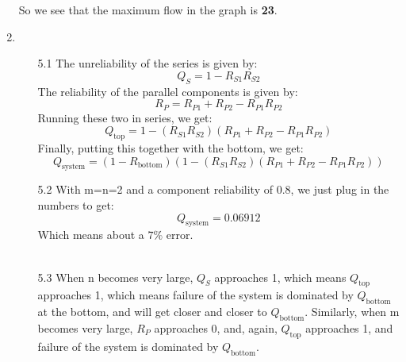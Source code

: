 \begin{enumerate}
\begin{figure}[H]
    \end{figure}
    So we see that the maximum flow in the graph is \textbf{23}.
  \item 
    \begin{itemize}
      \item [5.1]
        The unreliability of the series is given by:
        $$Q_S = 1 - R_{S1}R_{S2}$$
        The reliability of the parallel components is given by:
        $$R_P = R_{P1} + R_{P2} - R_{P1}R_{P2}$$
        Running these two in series, we get:
        $$Q_{\text{top}} = 1 - (R_{S1}R_{S2})(R_{P1} + R_{P2} - R_{P1}R_{P2})$$
        Finally, putting this together with the bottom, we get:
        $$Q_{\text{system}} = (1 - R_{\text{bottom}})(1 - (R_{S1}R_{S2})(R_{P1} + R_{P2} - R_{P1}R_{P2}))$$

      \item [5.2]
        With m=n=2 and a component reliability of $0.8$, we just plug in the numbers to get:
        $$Q_{\text{system}} = 0.06912$$
        Which means about a $7\%$ error.\\\\

      \item [5.3]
        When n becomes very large, $Q_S$ approaches 1, which means $Q_{\text{top}}$ approaches 1, which means failure of the system is dominated by $Q_{\text{bottom}}$ at the bottom, and will get closer and closer to $Q_{\text{bottom}}$. Similarly, when m becomes very large, $R_P$ approaches 0, and, again, $Q_{\text{top}}$ approaches 1, and failure of the system is dominated by $Q_{\text{bottom}}$.
    \end{itemize}
\end{enumerate}


